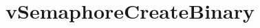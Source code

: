 \hypertarget{group__v_semaphore_create_binary}{}\section{v\+Semaphore\+Create\+Binary}
\label{group__v_semaphore_create_binary}
